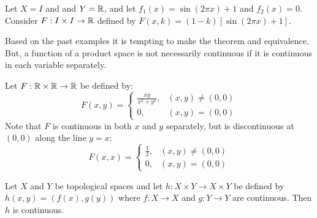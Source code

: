 \documentclass[letterpaper,12pt,fleqn]{article}
\begin{document}
\begin{example}[Scaling]
  Let \(X=I\) and and \(Y=\mathbb{R}\), and let \(f_1(x)=\sin(2\pi x)+1\) and \(f_2(x)=0\).  Consider \(F:I\times
  I\to\mathbb{R}\) defined by \(F(x,k)=(1-k)[\sin(2\pi x)+1]\).

\end{example}

Based on the past examples it is tempting to make the theorem and equivalence.  But, a function of a product
space is not necessarily continuous if it is continuous in each variable separately.

\begin{example}
  Let \(F:\mathbb{R}\times\mathbb{R}\to\mathbb{R}\) be defined by:
  \[F(x,y)=\begin{cases}
  \frac{xy}{x^2+y^2}, & (x,y)\ne(0,0) \\
  0, & (x,y)=(0,0)
  \end{cases}\]
  Note that \(F\) is continuous in both \(x\) and \(y\) separately, but is discontinuous at \((0,0)\) along the
  line \(y=x\):
  \[F(x,x)=\begin{cases}
  \frac{1}{2}, & (x,y)\ne(0,0) \\
  0, & (x,y)=(0,0)
  \end{cases}\]
\end{example}

\begin{lemma}
  Let \(X\) and \(Y\) be topological spaces and let \(h:X\times Y\to X\times Y\) be defined by
  \(h(x,y)=(f(x),g(y))\) where \(f:X\to X\) and \(g:Y\to Y\) are continuous.  Then \(h\) is continuous.
\end{lemma}
\end{document}
